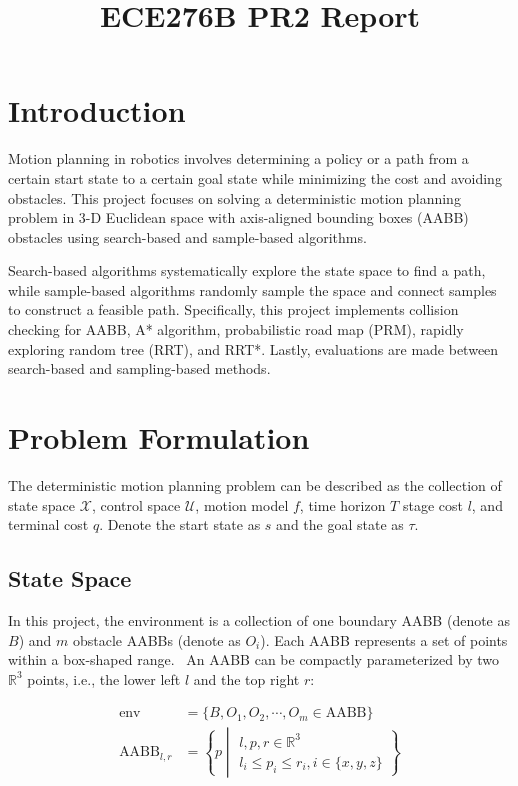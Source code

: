 \documentclass[conference]{IEEEtran}
\begin{document}
\title{ECE276B PR2 Report}

\author{
}

\maketitle

\section{Introduction}
Motion planning in robotics involves determining a policy or a path 
from a certain start state to a certain goal state 
while minimizing the cost and avoiding obstacles. 
This project focuses on solving a deterministic motion planning problem in 
3-D Euclidean space with axis-aligned bounding boxes (AABB) obstacles
using search-based and sample-based algorithms. 

Search-based algorithms systematically explore the state space to find a path, 
while sample-based algorithms randomly sample the space and connect samples to construct a feasible path. 
Specifically, this project implements collision checking for AABB, 
A* algorithm, probabilistic road map (PRM), rapidly exploring random tree (RRT), and RRT*. 
Lastly, evaluations are made between search-based and sampling-based methods.


\section{Problem Formulation}
The deterministic motion planning problem can be described as the collection of 
state space $\mathcal{X}$, control space $\mathcal{U}$, motion model $f$, time horizon $T$
stage cost $l$, and terminal cost $q$.
Denote the start state as $s$ and the goal state as $\tau$.

\subsection{State Space}
In this project, the environment is a collection of one boundary AABB (denote as $B$) 
and $m$ obstacle AABBs (denote as $O_i$). 
Each AABB represents a set of points within a box-shaped range. \
An AABB can be compactly parameterized by two $\mathbb{R}^3$ points, 
i.e., the lower left $l$ and the top right $r$:

\[
\begin{aligned}
    \text{env} &= \{B, O_1, O_2, \cdots, O_m \in \text{AABB}\} \\
    \text{AABB}_{l,r} &= \left\{ p \middle| \begin{gathered}
    l, p, r \in \mathbb{R}^{3} \\
    l_{i} \leq p_{i} \leq r_{i}, i \in \{x, y, z\}
    \end{gathered} \right\}
\end{aligned}
\]
\end{document}
